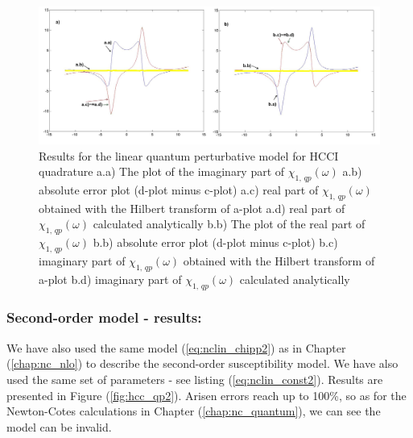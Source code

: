 \documentclass[12pt,twoside,a4paper]{article}
\numberwithin{equation}{subsection}
\numberwithin{figure}{subsection}
\begin{document}
\begin{figure}
  \includegraphics[width=150mm]{img/hcc_qp1.png}
  \caption{Results for the linear quantum perturbative model for HCCI quadrature
    a.a) The plot of the imaginary part of ${\chi_{1, \, qp}}(\omega )$
    a.b) absolute error plot (d-plot minus c-plot) 
    a.c) real part of ${\chi_{1, \, qp}}(\omega )$ obtained with the Hilbert transform of a-plot 
    a.d) real part of ${\chi_{1, \, qp}}(\omega )$ calculated analytically 
    b.b) The plot of the real part of ${\chi_{1, \, qp}}(\omega )$ 
    b.b) absolute error plot (d-plot minus c-plot) 
    b.c) imaginary part of ${\chi_{1, \, qp}}(\omega )$ obtained with the Hilbert transform of a-plot 
    b.d) imaginary part of ${\chi_{1, \, qp}}(\omega )$ calculated analytically  
    \label{fig:hcc_qp1}
  }
\end{figure}

\subsubsection*{Second-order model - results:}

We have also used the same model (\ref{eq:nclin_chipp2}) as in Chapter (\ref{chap:nc_nlo}) to describe the second-order susceptibility model. We have also used the same set of parameters - see listing (\ref{eq:nclin_const2}). Results are presented in Figure (\ref{fig:hcc_qp2}). Arisen errors reach up to 100\%, so as for the Newton-Cotes calculations in Chapter (\ref{chap:nc_quantum}), we can see the model can be invalid.
\end{document}
